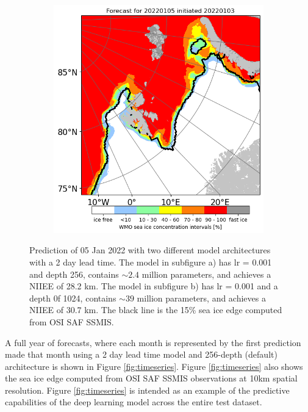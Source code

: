 \documentclass[../main/thesis]{subfiles}
\begin{document}
\begin{figure}
\begin{subfigure}[t]{0.455\textwidth}
        \includegraphics[width=\textwidth, valign=t]{unet_1024_jan}
    \end{subfigure}
    \caption{Prediction of 05 Jan 2022 with two different model architectures with a 2 day lead time. The model in subfigure a) has lr = 0.001 and depth 256, contains $\sim 2.4$ million parameters, and achieves a NIIEE of 28.2 km. The model in subfigure b) has lr = 0.001 and a depth 0f 1024, contains $\sim 39$ million parameters, and achieves a NIIEE of 30.7 km. The black line is the 15\% sea ice edge computed from OSI SAF SSMIS.}
    \label{fig:256_1024_compare}
\end{figure}

A full year of forecasts, where each month is represented by the first prediction made that month using a 2 day lead time model and 256-depth (default) architecture is shown in Figure \ref{fig:timeseries}. Figure \ref{fig:timeseries} also shows the sea ice edge computed from OSI SAF SSMIS observations at 10km spatial resolution. Figure \ref{fig:timeseries} is intended as an example of the predictive capabilities of the deep learning model across the entire test dataset. 
\end{document}
